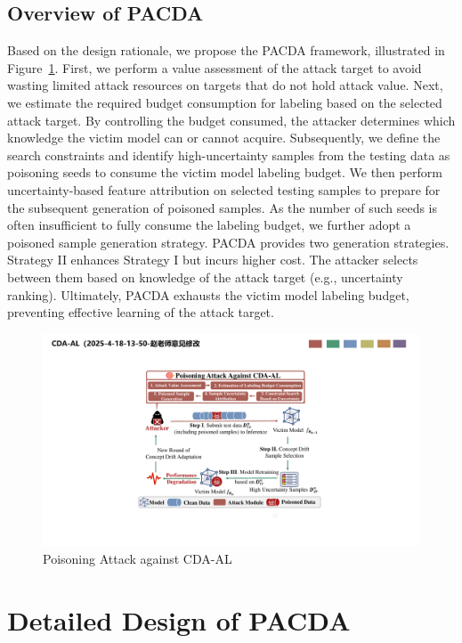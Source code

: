 \documentclass[conference,compsoc]{IEEEtran} %
\begin{document}
\subsection{Overview of PACDA}
Based on the design rationale, we propose the PACDA framework, illustrated in Figure~\ref{fig:Attack Process}.
First, we perform a value assessment of the attack target to avoid wasting limited attack resources on targets that do not hold attack value.
Next, we estimate the required budget consumption for labeling based on the selected attack target.
By controlling the budget consumed, the attacker determines which knowledge the victim model can or cannot acquire.
Subsequently, we define the search constraints and identify high-uncertainty samples from the testing data as poisoning seeds to consume the victim model  labeling budget.
We then perform uncertainty-based feature attribution on selected testing samples to prepare for the subsequent generation of poisoned samples.
As the number of such seeds is often insufficient to fully consume the labeling budget, we further adopt a poisoned sample generation strategy.
PACDA provides two generation strategies.
Strategy II enhances Strategy I but incurs higher cost.
The attacker selects between them based on knowledge of the attack target (e.g., uncertainty ranking).
Ultimately, PACDA exhausts the victim model  labeling budget, preventing effective learning of the attack target.
\begin{figure}[t]
	\centering
	\includegraphics[width=\linewidth,keepaspectratio]{Graph/Attack_Method/PACDA_attack_process_2025_4_23_01_06.pdf}
	\caption{Poisoning Attack against CDA-AL}
	\label{fig:Attack Process}
\end{figure}

\section{Detailed Design of PACDA}
\label{Sec: Detailed Design of PACDA}
\end{document}
